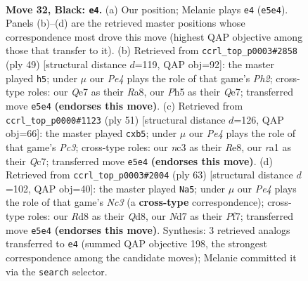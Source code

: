 \documentclass[11pt]{article}
\begin{document}
\clearpage

\begin{figure}[p]\centering
\begin{subfigure}{0.46\textwidth}\centering
\resizebox{\linewidth}{!}{%
\newchessgame
\chessboard[
  setfen={3r2k1/3nq1p1/rp3n2/3pp2p/P7/2N2NP1/2P2P1P/R1R1QK2 b - - 1 32},
  showmover=false,
  pgfstyle=straightmove, color=movearrow, markmove={e5-e4}
]}
\caption{}
\end{subfigure}\hfill
\begin{subfigure}{0.46\textwidth}\centering
\resizebox{\linewidth}{!}{%
\newchessgame
\chessboard[
  setfen={r5k1/p3qppp/3rnn2/2ppN3/8/1P3BP1/P1Q1PP1P/2RR2K1 b - - 14 25},
  showmover=false,
  pgfstyle=straightmove, color=movearrow, markmove={h7-h5}
]}
\caption{}
\end{subfigure}
\\[4pt]
\begin{subfigure}{0.46\textwidth}\centering
\resizebox{\linewidth}{!}{%
\newchessgame
\chessboard[
  setfen={4r1k1/2qn1pb1/1pp2npp/1P2p3/2P5/2BP2NP/3NQPP1/1R4K1 b - - 2 26},
  showmover=false,
  pgfstyle=straightmove, color=movearrow, markmove={c6-b5}
]}
\caption{}
\end{subfigure}\hfill
\begin{subfigure}{0.46\textwidth}\centering
\resizebox{\linewidth}{!}{%
\newchessgame
\chessboard[
  setfen={3q2k1/4rpp1/1rn1n2p/1p6/3p3P/PQ1N2P1/3NPP2/R3R1K1 b - - 2 32},
  showmover=false,
  pgfstyle=straightmove, color=movearrow, markmove={c6-a5}
]}
\caption{}
\end{subfigure}
\caption{\textbf{Move 32, Black: \texttt{e4}.} (a) Our position; Melanie plays \texttt{e4} (\texttt{e5e4}). Panels (b)--(d) are the retrieved master positions whose correspondence most drove this move (highest QAP objective among those that transfer to it). (b) Retrieved from \texttt{ccrl\_top\_p0003\#2858} (ply 49) [structural distance $d$=119, QAP obj=92]: the master played \texttt{h5}; under $\mu$ our \emph{Pe4} plays the role of that game's \emph{Ph2}; cross-type roles: our \emph{Q}e7 as their \emph{R}a8, our \emph{P}h5 as their \emph{Q}e7; transferred move \texttt{e5e4} \textbf{(endorses this move)}. (c) Retrieved from \texttt{ccrl\_top\_p0000\#1123} (ply 51) [structural distance $d$=126, QAP obj=66]: the master played \texttt{cxb5}; under $\mu$ our \emph{Pe4} plays the role of that game's \emph{Pc3}; cross-type roles: our \emph{n}c3 as their \emph{R}e8, our \emph{r}a1 as their \emph{Q}c7; transferred move \texttt{e5e4} \textbf{(endorses this move)}. (d) Retrieved from \texttt{ccrl\_top\_p0003\#2004} (ply 63) [structural distance $d$=102, QAP obj=40]: the master played \texttt{Na5}; under $\mu$ our \emph{Pe4} plays the role of that game's \emph{Nc3} (a \textbf{cross-type} correspondence); cross-type roles: our \emph{R}d8 as their \emph{Q}d8, our \emph{N}d7 as their \emph{P}f7; transferred move \texttt{e5e4} \textbf{(endorses this move)}. Synthesis: 3 retrieved analogs transferred to \texttt{e4} (summed QAP objective 198, the strongest correspondence among the candidate moves); Melanie committed it via the \texttt{search} selector.}
\label{fig:thought-m63}
\end{figure}
\end{document}
